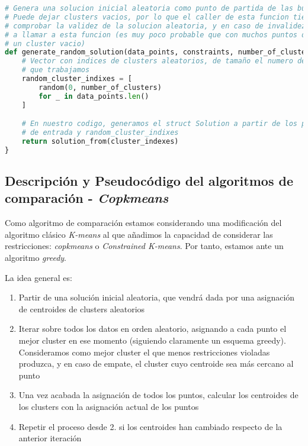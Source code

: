 \documentclass[11pt]{article}
\begin{document}
\begin{lstlisting}[language=Python, style=Boxed]
# Genera una solucion inicial aleatoria como punto de partida de las busquedas
# Puede dejar clusters vacios, por lo que el caller de esta funcion tiene que
# comprobar la validez de la solucion aleatoria, y en caso de invalidez, volver
# a llamar a esta funcion (es muy poco probable que con muchos puntos dejemos
# un cluster vacio)
def generate_random_solution(data_points, constraints, number_of_clusters):
    # Vector con indices de clusters aleatorios, de tamaño el numero de puntos
    # que trabajamos
    random_cluster_indixes = [
        random(0, number_of_clusters)
        for _ in data_points.len()
    ]

    # En nuestro codigo, generamos el struct Solution a partir de los parametros
    # de entrada y random_cluster_indixes
    return solution_from(cluster_indexes)
}
\end{lstlisting}


\pagebreak

\subsection{Descripción y Pseudocódigo del algoritmos de comparación - \emph{Copkmeans}}

Como algoritmo de comparación estamos considerando una modificación del algoritmo clásico \emph{K-means} al que añadimos la capacidad de considerar las restricciones: \emph{copkmeans} o \emph{Constrained K-means}. Por tanto, estamos ante un algoritmo \emph{greedy}.

La idea general es:

\begin{enumerate}
    \item Partir de una solución inicial aleatoria, que vendrá dada por una asignación de centroides de clusters aleatorios
    \item Iterar sobre todos los datos en orden aleatorio, asignando a cada punto el mejor cluster en ese momento (siguiendo claramente un esquema greedy). Consideramos como mejor cluster el que menos restricciones violadas produzca, y en caso de empate, el cluster cuyo centroide sea más cercano al punto
    \item Una vez acabada la asignación de todos los puntos, calcular los centroides de los clusters con la asignación actual de los puntos
    \item Repetir el proceso desde 2. si los centroides han cambiado respecto de la anterior iteración
\end{enumerate}
\end{document}
